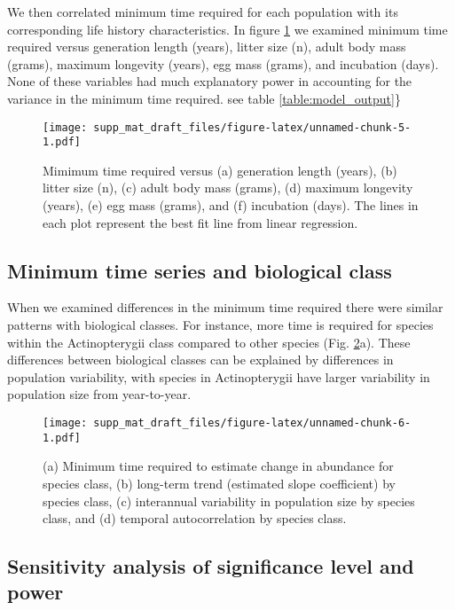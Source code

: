 \documentclass[12pt,]{article}
\begin{document}
We then correlated minimum time required for each population with its
corresponding life history characteristics. In figure
\ref{fig:biological_correlates} we examined minimum time required versus
generation length (years), litter size (n), adult body mass (grams),
maximum longevity (years), egg mass (grams), and incubation (days). None
of these variables had much explanatory power in accounting for the
variance in the minimum time required. see table
\ref{table:model_output}\}

\begin{figure}[htbp]
\centering
\texttt{[image: supp\_mat\_draft\_files/figure-latex/unnamed-chunk-5-1.pdf]}
\caption{Mimimum time required versus (a) generation length (years), (b)
litter size (n), (c) adult body mass (grams), (d) maximum longevity
(years), (e) egg mass (grams), and (f) incubation (days). The lines in
each plot represent the best fit line from linear
regression.\label{fig:biological_correlates}}
\end{figure}

\pagebreak

\subsection{Minimum time series and biological
class}\label{minimum-time-series-and-biological-class}

When we examined differences in the minimum time required there were
similar patterns with biological classes. For instance, more time is
required for species within the Actinopterygii class compared to other
species (Fig. \ref{fig:class}a). These differences between biological
classes can be explained by differences in population variability, with
species in Actinopterygii have larger variability in population size
from year-to-year.

\begin{figure}[htbp]
\centering
\texttt{[image: supp\_mat\_draft\_files/figure-latex/unnamed-chunk-6-1.pdf]}
\caption{(a) Minimum time required to estimate change in abundance for
species class, (b) long-term trend (estimated slope coefficient) by
species class, (c) interannual variability in population size by species
class, and (d) temporal autocorrelation by species
class.\label{fig:class}}
\end{figure}

\pagebreak

\subsection{Sensitivity analysis of significance level and
power}\label{sensitivity-analysis-of-significance-level-and-power}
\end{document}
